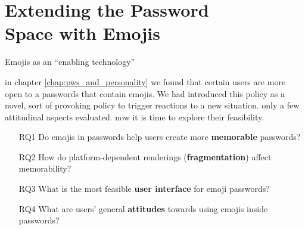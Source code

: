 \chapter[Extending the Password Space with Emojis]{Extending the Password \\ Space with Emojis}\label{chap:emojipasswords}


Emojis as an ``enabling technology''

in chapter \ref{chap:pws_and_personality} we found that certain users are more open to a passwords that contain emojis. We had introduced this policy as a novel, sort of provoking policy to trigger reactions to a new situation. only a few attitudinal aspects evaluated. now it is time to explore their feasibility. 


\begin{itemize}
	\item[RQ1] Do emojis in passwords help users create more \textbf{memorable} passwords?
	\item[RQ2] How do platform-dependent renderings (\textbf{fragmentation}) affect memorability?
	\item[RQ3] What is the most feasible \textbf{user interface} for emoji passwords?
	\item[RQ4] What are users' general \textbf{attitudes} towards using emojis inside passwords?
\end{itemize}

